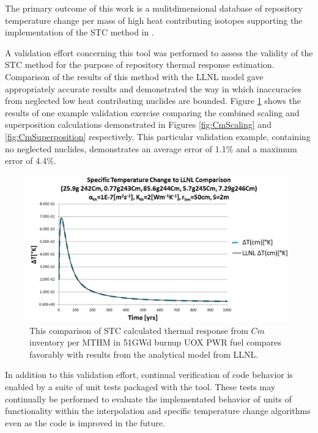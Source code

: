 
The primary outcome of this work is a mulitdimensional database of repository temperature 
change per mass of high heat contributing isotopes supporting the implementation 
of the \gls{STC} method in \Cyder. 

A validation effort concerning this tool was performed to assess the validity of 
the \gls{STC} method for the purpose of repository thermal response estimation.  
Comparison of the results of this method with the \gls{LLNL} model 
\cite{greenberg_application_2012} gave 
appropriately accurate results and demonstrated the way in which inaccuracies 
from neglected low heat contributing nuclides are bounded. Figure 
\ref{fig:CmValidation} shows the results of one example validation exercise 
comparing the combined scaling and  superposition calculations demonstrated in 
Figures \ref{fig:CmScaling} and \ref{fig:CmSuperposition} respectively. This 
particular validation example, containing no neglected nuclides, demonstrates 
an average error of 1.1\% and a maximum error of 4.4\%.

\begin{figure}[htp!]
\begin{center}
\includegraphics[width=\columnwidth]{./chapters/methodology/thermal_models/CmValidation.eps}
\end{center}
\caption{This comparison of \gls{STC} calculated thermal response from $Cm$ 
inventory per MTHM in 51GWd burnup UOX PWR fuel compares favorably with results 
from the analytical model from LLNL.} 
\label{fig:CmValidation}
\end{figure}

In addition to this validation effort, continual verification of code behavior
is enabled by a suite of unit tests packaged with the tool. These tests may
continually be performed to evaluate the implementated behavior of units of
functionality within the interpolation and specific temperature change
algorithms even as the code is improved in the future.  
